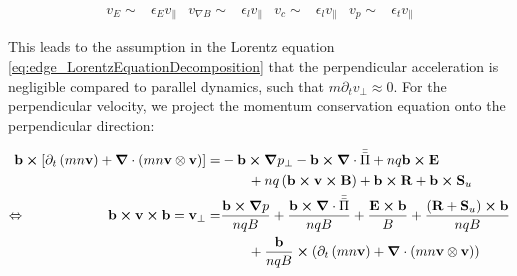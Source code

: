 \begin{align}
	v_E \sim& \epsilon_E v_\parallel & v_{\nabla B} \sim& \epsilon_l v_\parallel & v_c \sim& \epsilon_l v_\parallel  & v_p \sim& \epsilon_t v_\parallel
\end{align}

This leads to the assumption in the Lorentz equation \ref{eq:edge_LorentzEquationDecomposition} that the perpendicular acceleration is negligible compared to parallel dynamics, such that $m\partial_t v_\perp \approx 0$. For the perpendicular velocity, we project the momentum conservation equation onto the perpendicular direction:

\begin{align}
	\mathbf{b}\cross\left[\partial_t \left(mn\mathbf{v}\right) + \grad\cdot\left(mn\mathbf{v}\otimes\mathbf{v}\right)\right] =& -\mathbf{b}\cross\grad p_\perp - \mathbf{b}\cross\grad\cdot\bar{\bar{\Pi}} + nq\mathbf{b}\cross\mathbf{E} \nonumber\\ & \qquad + nq\left(\mathbf{b}\cross\mathbf{v}\cross\mathbf{B}\right) + \mathbf{b}\cross\mathbf{R} + \mathbf{b}\cross\mathbf{S}_u \nonumber \\
	\Leftrightarrow\qquad \qquad \qquad
	\mathbf{b}\cross\mathbf{v}\cross\mathbf{b} = \mathbf{v}_\perp =& \frac{\mathbf{b}\cross\grad p}{nqB} + \frac{\mathbf{b}\cross\grad\cdot\bar{\bar{\Pi}}}{nqB} +  \frac{\mathbf{E}\cross\mathbf{b}}{B} + \frac{\left(\textbf{R}+\textbf{S}_u\right)\cross\mathbf{b}}{nqB} \nonumber\\ & \qquad + \frac{\mathbf{b}}{nqB} \cross \left(\partial_t \left(mn\mathbf{v}\right) + \grad\cdot\left(mn\mathbf{v}\otimes\mathbf{v}\right)\right)
\end{align}



